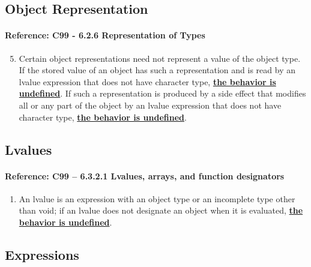 \documentclass[11pt]{article}
\begin{document}
\subsection{Object Representation}
\label{app:representation}

\paragraph{Reference: C99 - 6.2.6 Representation of Types}
\begin{enumerate}
\setcounter{enumi}{4}
\item Certain object representations need not represent a value of the object type. If the 
stored value of an object has such a representation and is read by an lvalue expression 
that does not have character type, \underline{\bf the behavior is undefined}. 
If such a representation 
is produced by a side effect that modifies all or any part of the object by an lvalue 
expression that does not have character type, \underline{\bf the behavior is undefined}.
\end{enumerate}

\subsection{Lvalues}
\label{app:lvalues}

\paragraph{Reference: C99 -- 6.3.2.1 Lvalues, arrays, and function designators}
\begin{enumerate}
\item  An lvalue is an expression with an object type or an incomplete type other 
than void; if an lvalue does not designate an object when it is evaluated, 
\underline{\bf the behavior is undefined}.
\end{enumerate}

\subsection{Expressions}
\label{app:exp}
\end{document}
